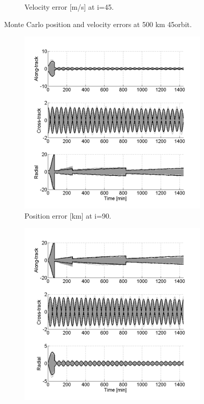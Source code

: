 \documentclass[]{aiaa-tc}%
\begin{document}
\begin{figure}[h!]
\begin{subfigure}{.49\textwidth}
		\caption{Velocity error [m/s] at i=45\degree.}
		\label{fig:mcvel45_500}
	\end{subfigure}
	\caption{Monte Carlo position and velocity errors at 500 km 45\degree orbit.}
	\label{fig:mc45_500}
\end{figure}
\begin{figure}[h!]
	\centering
	\begin{subfigure}{.49\textwidth}
		\centering
		\includegraphics{MC_pos90_500}
		\caption{Position error [km] at i=90\degree.}
		\label{fig:mcposl90_500}
	\end{subfigure}%
	\begin{subfigure}{.49\textwidth} 
		\centering
		\includegraphics{MC_vel90_500}

\end{subfigure}
\end{figure}
\end{document}
